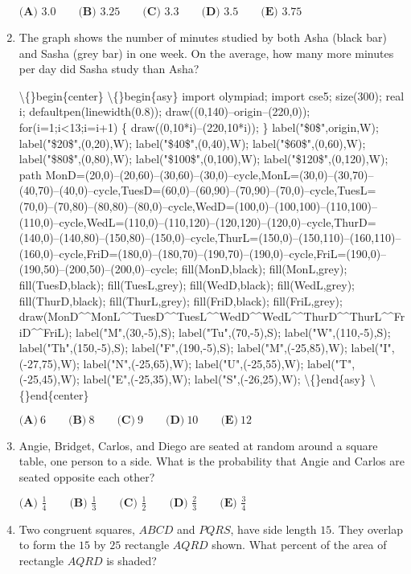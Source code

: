 \documentclass{article}
\begin{document}
\begin{enumerate}[label=\arabic*., itemsep=0.5em]
\( \textbf{(A) } 3.0\qquad\textbf{(B) }3.25\qquad\textbf{(C) }3.3\qquad\textbf{(D) }3.5\qquad\textbf{(E) }3.75 \)\par \vspace{0.5em}\item The graph shows the number of minutes studied by both Asha (black bar) and Sasha (grey bar) in one week. On the average, how many more minutes per day did Sasha study than Asha?

\textbackslash\{\}begin\{center\}
\textbackslash\{\}begin\{asy\}
import olympiad;
import cse5;
size(300);
real i;
defaultpen(linewidth(0.8));
draw((0,140)--origin--(220,0));
for(i=1;i<13;i=i+1) \{
draw((0,10*i)--(220,10*i));
\}
label("\$0\$",origin,W);
label("\$20\$",(0,20),W);
label("\$40\$",(0,40),W);
label("\$60\$",(0,60),W);
label("\$80\$",(0,80),W);
label("\$100\$",(0,100),W);
label("\$120\$",(0,120),W);
path MonD=(20,0)--(20,60)--(30,60)--(30,0)--cycle,MonL=(30,0)--(30,70)--(40,70)--(40,0)--cycle,TuesD=(60,0)--(60,90)--(70,90)--(70,0)--cycle,TuesL=(70,0)--(70,80)--(80,80)--(80,0)--cycle,WedD=(100,0)--(100,100)--(110,100)--(110,0)--cycle,WedL=(110,0)--(110,120)--(120,120)--(120,0)--cycle,ThurD=(140,0)--(140,80)--(150,80)--(150,0)--cycle,ThurL=(150,0)--(150,110)--(160,110)--(160,0)--cycle,FriD=(180,0)--(180,70)--(190,70)--(190,0)--cycle,FriL=(190,0)--(190,50)--(200,50)--(200,0)--cycle;
fill(MonD,black);
fill(MonL,grey);
fill(TuesD,black);
fill(TuesL,grey);
fill(WedD,black);
fill(WedL,grey);
fill(ThurD,black);
fill(ThurL,grey);
fill(FriD,black);
fill(FriL,grey);
draw(MonD\^{}\^{}MonL\^{}\^{}TuesD\^{}\^{}TuesL\^{}\^{}WedD\^{}\^{}WedL\^{}\^{}ThurD\^{}\^{}ThurL\^{}\^{}FriD\^{}\^{}FriL);
label("M",(30,-5),S);
label("Tu",(70,-5),S);
label("W",(110,-5),S);
label("Th",(150,-5),S);
label("F",(190,-5),S);
label("M",(-25,85),W);
label("I",(-27,75),W);
label("N",(-25,65),W);
label("U",(-25,55),W);
label("T",(-25,45),W);
label("E",(-25,35),W);
label("S",(-26,25),W);
\textbackslash\{\}end\{asy\}
\textbackslash\{\}end\{center\}


\( \textbf{(A)}\ 6\qquad\textbf{(B)}\ 8\qquad\textbf{(C)}\ 9\qquad\textbf{(D)}\ 10\qquad\textbf{(E)}\ 12 \)\par \vspace{0.5em}\item Angie, Bridget, Carlos, and Diego are seated at random around a square table, one person to a side. What is the probability that Angie and Carlos are seated opposite each other?

\( \textbf{(A) } \frac14 \qquad\textbf{(B) } \frac13 \qquad\textbf{(C) } \frac12 \qquad\textbf{(D) } \frac23 \qquad\textbf{(E) } \frac34 \)\par \vspace{0.5em}\item Two congruent squares, \(ABCD\) and \(PQRS\), have side length \(15\). They overlap to form the \(15\) by \(25\) rectangle \(AQRD\) shown. What percent of the area of rectangle \(AQRD\) is shaded? 


\end{enumerate}
\end{document}
